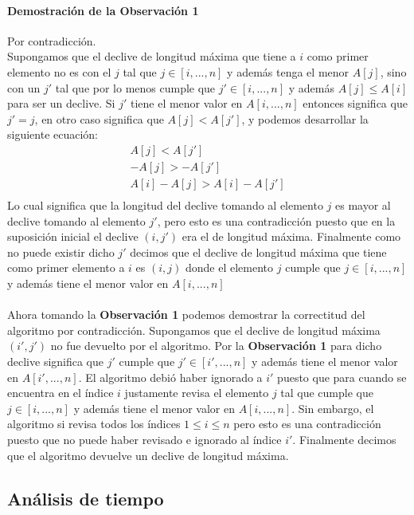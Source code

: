 \documentclass[12pt]{article}
\begin{document}
\paragraph{Demostración de la Observación 1} Por contradicción.\\
Supongamos que el declive de longitud máxima que tiene a $i$ como primer elemento no es con el $j$ tal que $j \in [i,...,n]$ y además tenga el menor $A[j]$, sino con un $j'$ tal que por lo menos cumple que $j' \in [i,...,n]$ y además $A[j] \leq A[i]$ para ser un declive. Si $j'$ tiene el menor valor en $A[i,...,n]$ entonces significa que $j' = j$, en otro caso significa que $A[j]< A[j']$, y podemos desarrollar la siguiente ecuación:
\begin{equation}
	\begin{split}
	A[j]< A[j']\\ 
	-A[j]> -A[j']\\
	A[i]-A[j]> A[i]-A[j']\\
	\end{split}
\end{equation}
Lo cual significa que la longitud del declive tomando al elemento $j$ es mayor al declive tomando al elemento $j'$, pero esto es una contradicción puesto que en la suposición inicial el declive $(i, j')$ era el de longitud máxima.
Finalmente como no puede existir dicho $j'$ decimos que el declive de longitud máxima que tiene como primer elemento a $i$ es $(i,j)$ donde el elemento $j$ cumple que $j \in [i,...,n]$ y además tiene el menor valor en $A[i,...,n]$
\paragraph{} Ahora tomando la \textbf{Observación 1} podemos demostrar la correctitud del algoritmo por contradicción.
Supongamos que el declive de longitud máxima $(i',j')$ no fue devuelto por el algoritmo. Por la \textbf{Observación 1} para dicho declive significa que $j'$ cumple que $j' \in [i',...,n]$ y además tiene el menor valor en $A[i',...,n]$. El algoritmo debió haber ignorado a $i'$ puesto que para cuando se encuentra en el índice $i$ justamente revisa el elemento $j$ tal que cumple que $j \in [i,...,n]$ y además tiene el menor valor en $A[i,...,n]$. Sin embargo, el algoritmo si revisa todos los índices $1 \leq i \leq n$ pero esto es una contradicción puesto que no puede haber revisado e ignorado al índice $i'$. Finalmente decimos que el algoritmo devuelve un declive de longitud máxima.
\subsection{Análisis de tiempo}
\end{document}
